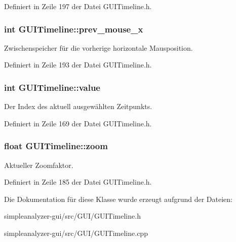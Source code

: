 Definiert in Zeile 197 der Datei G\-U\-I\-Timeline.\-h.

\hypertarget{classGUITimeline_a16d456832948e97e9364856f92d97f5c}{
\subsubsection[{prev\-\_\-mouse\-\_\-x}]{\setlength{\rightskip}{0pt plus 5cm}int G\-U\-I\-Timeline\-::prev\-\_\-mouse\-\_\-x\hspace{0.3cm}{\ttfamily [private]}}}\label{classGUITimeline_a16d456832948e97e9364856f92d97f5c}
Zwischenspeicher für die vorherige horizontale Mausposition. 

Definiert in Zeile 193 der Datei G\-U\-I\-Timeline.\-h.

\hypertarget{classGUITimeline_a0ba036e4a58176c5e868662510717ae2}{
\subsubsection[{value}]{\setlength{\rightskip}{0pt plus 5cm}int G\-U\-I\-Timeline\-::value\hspace{0.3cm}{\ttfamily [private]}}}\label{classGUITimeline_a0ba036e4a58176c5e868662510717ae2}
Der Index des aktuell ausgewählten Zeitpunkts. 

Definiert in Zeile 169 der Datei G\-U\-I\-Timeline.\-h.

\hypertarget{classGUITimeline_a9b5b63103a41b6e661cfb30acfcda448}{
\subsubsection[{zoom}]{\setlength{\rightskip}{0pt plus 5cm}float G\-U\-I\-Timeline\-::zoom\hspace{0.3cm}{\ttfamily [private]}}}\label{classGUITimeline_a9b5b63103a41b6e661cfb30acfcda448}
Aktueller Zoomfaktor. 

Definiert in Zeile 185 der Datei G\-U\-I\-Timeline.\-h.



Die Dokumentation für diese Klasse wurde erzeugt aufgrund der Dateien\-:\begin{DoxyCompactItemize}
\item 
simpleanalyzer-\/gui/src/\-G\-U\-I/G\-U\-I\-Timeline.\-h\item 
simpleanalyzer-\/gui/src/\-G\-U\-I/G\-U\-I\-Timeline.\-cpp\end{DoxyCompactItemize}
